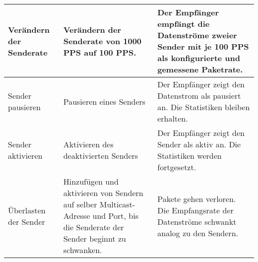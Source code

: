 \begin{table}[h]
\begin{center}
\begin{tabular}{|p{2.5cm}|p{5cm}|p{7.55cm}|}
                \hline
                    Verändern der Senderate & Verändern der Senderate von 1000
                    PPS auf 100 PPS. & Der Empfänger empfängt die Datenströme
                    zweier Sender mit je 100 PPS als konfigurierte und
                    gemessene Paketrate.\\
                \hline
                    Sender pausieren & Pausieren eines Senders & Der Empfänger
                    zeigt den Datenstrom als pausiert an. Die Statistiken
                    bleiben erhalten.\\
                \hline
                    Sender aktivieren & Aktivieren des deaktivierten Senders &
                    Der Empfänger zeigt den Sender als aktiv an. Die Statistiken
                    werden fortgesetzt.\\
                \hline
                    Überlasten der Sender & Hinzufügen und aktivieren von
                    Sendern auf selber Multicast-Adresse und Port, bis die
                    Senderate der Sender beginnt zu schwanken. & Pakete gehen
                    verloren. Die Empfangsrate der Datenströme schwankt analog
                    zu den Sendern.\\
                \hline
            \end{tabular}
        \end{center}
    \end{table}
    
